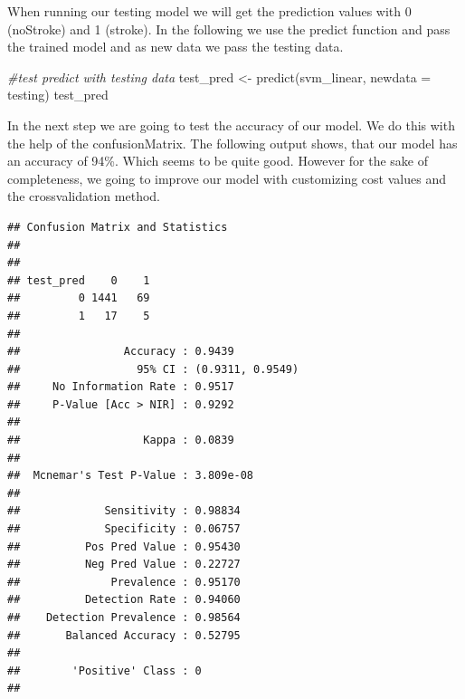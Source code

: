 \documentclass[
]{article}
\newenvironment{Shaded}{\begin{snugshade}}{\end{snugshade}}
\newcommand{\AttributeTok}[1]{\textcolor[rgb]{0.77,0.63,0.00}{#1}}
\newcommand{\CommentTok}[1]{\textcolor[rgb]{0.56,0.35,0.01}{\textit{#1}}}
\newcommand{\FunctionTok}[1]{\textcolor[rgb]{0.00,0.00,0.00}{#1}}
\newcommand{\NormalTok}[1]{#1}
\newcommand{\OtherTok}[1]{\textcolor[rgb]{0.56,0.35,0.01}{#1}}
\newcommand{\SpecialCharTok}[1]{\textcolor[rgb]{0.00,0.00,0.00}{#1}}
\renewcommand{\=}[1]{\stackrel{#1}{=}}
\theoremstyle{definition}
\theoremstyle{remark}
\begin{document}
When running our testing model we will get the prediction values with 0 (noStroke) and 1 (stroke). In the following we use the predict function and pass the trained model and as new data we pass the testing data.

\begin{Shaded}
\begin{Highlighting}[]
\CommentTok{\#test predict with testing data}
\NormalTok{test\_pred }\OtherTok{\textless{}{-}} \FunctionTok{predict}\NormalTok{(svm\_linear, }\AttributeTok{newdata =}\NormalTok{ testing)}
\NormalTok{test\_pred}
\end{Highlighting}
\end{Shaded}

In the next step we are going to test the accuracy of our model. We do this with the help of the confusionMatrix. The following output shows, that our model has an accuracy of 94\%. Which seems to be quite good. However for the sake of completeness, we going to improve our model with customizing cost values and the crossvalidation method.

\begin{Shaded}
\end{Shaded}

\begin{verbatim}
## Confusion Matrix and Statistics
## 
##          
## test_pred    0    1
##         0 1441   69
##         1   17    5
##                                           
##                Accuracy : 0.9439          
##                  95% CI : (0.9311, 0.9549)
##     No Information Rate : 0.9517          
##     P-Value [Acc > NIR] : 0.9292          
##                                           
##                   Kappa : 0.0839          
##                                           
##  Mcnemar's Test P-Value : 3.809e-08       
##                                           
##             Sensitivity : 0.98834         
##             Specificity : 0.06757         
##          Pos Pred Value : 0.95430         
##          Neg Pred Value : 0.22727         
##              Prevalence : 0.95170         
##          Detection Rate : 0.94060         
##    Detection Prevalence : 0.98564         
##       Balanced Accuracy : 0.52795         
##                                           
##        'Positive' Class : 0               
## 
\end{verbatim}
\end{document}
